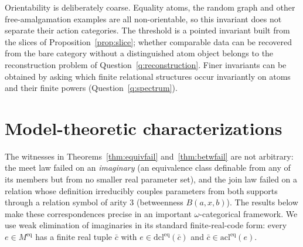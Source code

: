 \documentclass{lmcs}
\begin{document}
\begin{rem}\label{rem:rado}
Orientability is deliberately coarse. Equality atoms, the random graph
and other free-amalgamation examples are all non-orientable, so this
invariant does not separate their action categories. The threshold is a pointed invariant built from the slices of Proposition~\ref{prop:slice};
whether comparable data can be recovered from the bare category without a
distinguished atom object belongs to the reconstruction problem of
Question~\ref{q:reconstruction}. Finer invariants can be obtained by
asking which finite relational structures occur invariantly on atoms and
their finite powers (Question~\ref{q:spectrum}).
\end{rem}


\section{Model-theoretic characterizations}\label{sec:modeltheory}

The witnesses in Theorems~\ref{thm:equivfail} and~\ref{thm:betwfail}
are not arbitrary: the meet law failed on an \emph{imaginary} (an
equivalence class definable from any of its members but from no
smaller real parameter set), and the join law failed on a relation
whose definition irreducibly couples parameters from both supports
through a relation symbol of arity $3$ (betweenness $B(a,x,b)$). The
results below make these correspondences precise in an important
$\omega$-categorical framework. We use weak elimination of
imaginaries in its standard finite-real-code form: every
$e\in M^{\mathrm{eq}}$ has a finite real tuple $\bar c$ with
$e\in\mathrm{dcl}^{\mathrm{eq}}(\bar c)$ and
$\bar c\in\mathrm{acl}^{\mathrm{eq}}(e)$.
\end{document}
